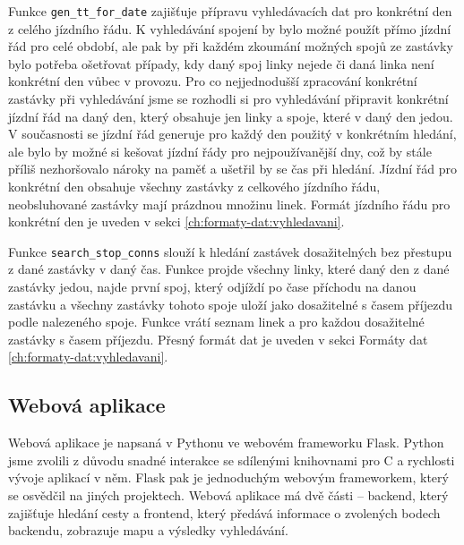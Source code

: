 Funkce {\tt gen\_tt\_for\_date} zajišťuje přípravu vyhledávacích dat pro
konkrétní den z celého jízdního řádu. K vyhledávání spojení by bylo možné použít
přímo jízdní řád pro celé období, ale pak by při každém zkoumání možných spojů
ze zastávky bylo potřeba ošetřovat případy, kdy daný spoj linky nejede či daná
linka není konkrétní den vůbec v provozu. Pro co nejjednodušší zpracování
konkrétní zastávky při vyhledávání jsme se rozhodli si pro vyhledávání připravit
konkrétní jízdní řád na daný den, který obsahuje jen linky a spoje, které v daný
den jedou. V současnosti se jízdní řád generuje pro každý den použitý v
konkrétním hledání, ale bylo by možné si kešovat jízdní řády pro nejpoužívanější
dny, což by stále příliš nezhoršovalo nároky na paměť a ušetřil by se čas při
hledání. Jízdní řád pro konkrétní den obsahuje všechny zastávky z celkového
jízdního řádu, neobsluhované zastávky mají prázdnou množinu linek. Formát
jízdního řádu pro konkrétní den je uveden v sekci \ref{ch:formaty-dat:vyhledavani}.

Funkce {\tt search\_stop\_conns} slouží k hledání zastávek dosažitelných bez
přestupu z dané zastávky v daný čas. Funkce projde všechny linky, které daný den
z dané zastávky jedou, najde první spoj, který odjíždí po čase příchodu na danou
zastávku a všechny zastávky tohoto spoje uloží jako dosažitelné s časem příjezdu
podle nalezeného spoje. Funkce vrátí seznam linek a pro každou dosažitelné
zastávky s časem příjezdu. Přesný formát dat je uveden v sekci Formáty dat
\ref{ch:formaty-dat:vyhledavani}.

\subsection{Webová aplikace}
\label{ch:implementace:webapp}
Webová aplikace je napsaná v Pythonu ve webovém frameworku Flask\cite{Flask}.
Python jsme zvolili z důvodu snadné interakce se sdílenými knihovnami pro C a
rychlosti vývoje aplikací v něm. Flask pak je jednoduchým webovým frameworkem,
který se osvědčil na jiných projektech. Webová aplikace má dvě části -- backend,
který zajišťuje hledání cesty a frontend, který předává informace o zvolených
bodech backendu, zobrazuje mapu a výsledky vyhledávání. 

